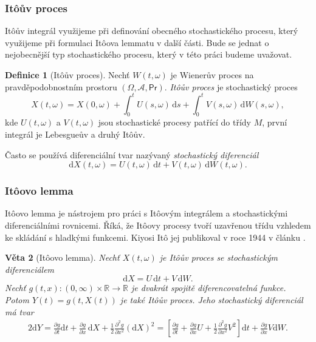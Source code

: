 \documentclass[a4paper,12pt]{report}
\newtheorem{veta}{Věta}
\theoremstyle{definition} \newtheorem{definice}[veta]{Definice}
\theoremstyle{remark}
\begin{document}
\subsubsection{It\^oův proces}

It\^oův integrál využijeme při definování obecného stochastického procesu, který využijeme při formulaci It\^oova lemmatu v další části.
Bude se jednat o nejobecnější typ stochastického procesu, který v této práci budeme uvažovat.

\begin{definice}[It\^oův proces]
Nechť $W(t,\omega)$ je Wienerův proces na pravděpodobnostním prostoru $(\Omega,\mathcal{A},\mathsf{Pr})$.
\textit{It\^oův proces} je stochastický proces
$$X(t,\omega)=X(0,\omega)+\int_0^tU(s,\omega)\,\mathrm{d}s+\int_0^tV(s,\omega)\,\mathrm{d}W(s,\omega),$$
kde $U(t,\omega)$ a $V(t,\omega)$ jsou stochastické procesy patřící do třídy $M$,
první integrál je Lebesgueův a druhý It\^oův. %

Často se používá diferenciální tvar nazývaný \textit{stochastický diferenciál}
$$\mathrm{d}X(t,\omega)=U(t,\omega)\,\mathrm{d}t+V(t,\omega)\,\mathrm{d}W(t,\omega).$$
\end{definice}


\subsubsection{It\^oovo lemma}
It\^oovo lemma je nástrojem pro práci s It\^oovým integrálem a stochastickými diferenciálními rovnicemi.
Říká, že It\^oovy procesy tvoří uzavřenou třídu vzhledem ke skládání s hladkými funkcemi.
Kiyosi It\^o jej publikoval v roce 1944 v článku \cite{ito1944}.
\begin{veta}[It\^oovo lemma]\label{ito_lemma}
Nechť $X(t,\omega)$ je It\^oův proces se stochastickým diferenciálem
$$\mathrm{d}X=U\,\mathrm{d}t+V\,\mathrm{d}W.$$
Nechť $g(t,x):(0,\infty)\times\mathbb R\to\mathbb R$ je dvakrát spojitě diferencovatelná funkce.
Potom $Y(t)=g(t,X(t))$ je také It\^oův proces.
Jeho stochastický diferenciál má tvar
\begin{alignat*}{2}
\mathrm{d}Y=\frac{\partial g}{\partial t}\mathrm{d}t+\frac{\partial g}{\partial x}\,\mathrm{d}X+\frac12\frac{\partial^2 g}{\partial x^2}(\mathrm{d}X)^2=\left[\frac{\partial g}{\partial t}+\frac{\partial g}{\partial x}U+\frac12\frac{\partial^2 g}{\partial x^2}V^2\right]\mathrm{d}t+\frac{\partial g}{\partial x}V\mathrm{d}W.
\end{alignat*}
\end{veta}
\end{document}
